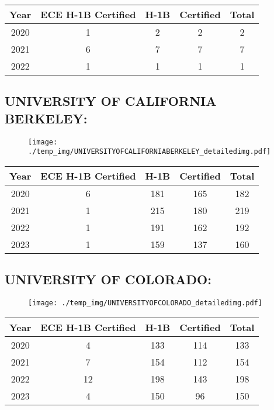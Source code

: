 \documentclass{article}%
\begin{document}
%
\begin{longtable}{c|c|c|c|c}%
\hline%
Year&ECE H{-}1B Certified&H{-}1B&Certified&Total\\%
\hline%
2020&1&2&2&2\\%
\hline%
2021&6&7&7&7\\%
\hline%
2022&1&1&1&1\\%
\hline%
\end{longtable}

%
\newpage%
\subsection{UNIVERSITY OF CALIFORNIA BERKELEY:}%
\label{subsec:UNIVERSITYOFCALIFORNIABERKELEY}%
\label{UNIVERSITYOFCALIFORNIABERKELEYdetailed}%


\begin{figure}[htbp]%
\centering%
\texttt{[image: ./temp\_img/UNIVERSITYOFCALIFORNIABERKELEY\_detailedimg.pdf]}%
\end{figure}

%
\begin{longtable}{c|c|c|c|c}%
\hline%
Year&ECE H{-}1B Certified&H{-}1B&Certified&Total\\%
\hline%
2020&6&181&165&182\\%
\hline%
2021&1&215&180&219\\%
\hline%
2022&1&191&162&192\\%
\hline%
2023&1&159&137&160\\%
\hline%
\end{longtable}

%
\newpage%
\subsection{UNIVERSITY OF COLORADO:}%
\label{subsec:UNIVERSITYOFCOLORADO}%
\label{UNIVERSITYOFCOLORADOdetailed}%


\begin{figure}[htbp]%
\centering%
\texttt{[image: ./temp\_img/UNIVERSITYOFCOLORADO\_detailedimg.pdf]}%
\end{figure}

%
\begin{longtable}{c|c|c|c|c}%
\hline%
Year&ECE H{-}1B Certified&H{-}1B&Certified&Total\\%
\hline%
2020&4&133&114&133\\%
\hline%
2021&7&154&112&154\\%
\hline%
2022&12&198&143&198\\%
\hline%
2023&4&150&96&150\\%
\hline%
\end{longtable}
\end{document}
